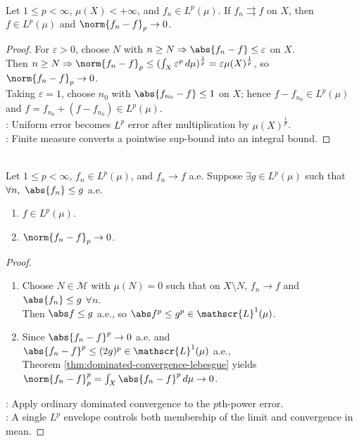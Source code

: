 \begin{proposition} \label{prop:uniform-to-lp-on-finite-measure} \\
Let $1\leq p<\infty$, $\mu(X)<+\infty$, and $f_n\in L^p(\mu)$. If $f_n\rightrightarrows f$ on $X$, then $f\in L^p(\mu)$ and $\norm{f_n-f}_p\to0$.
\begin{proof}
For $\varepsilon>0$, choose $N$ with $n\geq N\Rightarrow \abs{f_n-f}\leq\varepsilon$ on $X$.\\
Then $n\geq N\Rightarrow \norm{f_n-f}_p\leq(\int_X\varepsilon^p\,d\mu)^{\frac{1}{p}}=\varepsilon\mu(X)^{\frac{1}{p}}$, so $\norm{f_n-f}_p\to0$.\\
Taking $\varepsilon=1$, choose $n_0$ with $\abs{f_{n_0}-f}\leq1$ on $X$; hence $f-f_{n_0}\in L^p(\mu)$ and $f=f_{n_0}+(f-f_{n_0})\in L^p(\mu)$.\\
: Uniform error becomes $L^p$ error after multiplication by $\mu(X)^{\frac{1}{p}}$.\\
: Finite measure converts a pointwise sup-bound into an integral bound.
\end{proof}
\end{proposition}

\begin{theorem} \label{thm:dominated-ae-to-lp} \\
Let $1\leq p<\infty$, $f_n\in L^p(\mu)$, and $f_n\to f$ a.e. Suppose $\exists g\in L^p(\mu)$ such that $\forall n,\ \abs{f_n}\leq g$ a.e.
\begin{enumerate}[label=(\roman*)]
\setlength{\itemsep}{0pt}
\item $f\in L^p(\mu)$.
\item $\norm{f_n-f}_p\to0$.
\end{enumerate}
\begin{proof}
\begin{enumerate}[label=(\roman*)]
\setlength{\itemsep}{0pt}
\item Choose $N\in\mathcal M$ with $\mu(N)=0$ such that on $X\setminus N$, $f_n\to f$ and $\abs{f_n}\leq g$ $\forall n$.\\
Then $\abs f\leq g$ a.e., so $\abs f^p\leq g^p\in\mathscr{L}^1(\mu)$.
\item Since $\abs{f_n-f}^p\to0$ a.e. and $\abs{f_n-f}^p\leq(2g)^p\in\mathscr{L}^1(\mu)$ a.e.,\\
Theorem \ref{thm:dominated-convergence-lebesgue} yields $\norm{f_n-f}_p^p=\int_X\abs{f_n-f}^p\,d\mu\to0$.
\end{enumerate}
: Apply ordinary dominated convergence to the $p$th-power error.\\
: A single $L^p$ envelope controls both membership of the limit and convergence in mean.
\end{proof}
\end{theorem}

